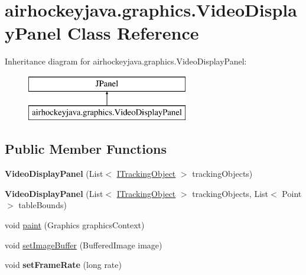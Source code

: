 \hypertarget{classairhockeyjava_1_1graphics_1_1_video_display_panel}{}\section{airhockeyjava.\+graphics.\+Video\+Display\+Panel Class Reference}
\label{classairhockeyjava_1_1graphics_1_1_video_display_panel}
Inheritance diagram for airhockeyjava.\+graphics.\+Video\+Display\+Panel\+:\begin{figure}[H]
\begin{center}
\leavevmode
\includegraphics[height=2.000000cm]{classairhockeyjava_1_1graphics_1_1_video_display_panel}
\end{center}
\end{figure}
\subsection*{Public Member Functions}
\begin{DoxyCompactItemize}
\item 
\hypertarget{classairhockeyjava_1_1graphics_1_1_video_display_panel_a5dc899a402834d27f1c40504cfdc2646}{}{\bfseries Video\+Display\+Panel} (List$<$ \hyperlink{interfaceairhockeyjava_1_1detection_1_1_i_tracking_object}{I\+Tracking\+Object} $>$ tracking\+Objects)\label{classairhockeyjava_1_1graphics_1_1_video_display_panel_a5dc899a402834d27f1c40504cfdc2646}

\item 
\hypertarget{classairhockeyjava_1_1graphics_1_1_video_display_panel_a5ddde84f00088c31dc4d0a8604b6f9e9}{}{\bfseries Video\+Display\+Panel} (List$<$ \hyperlink{interfaceairhockeyjava_1_1detection_1_1_i_tracking_object}{I\+Tracking\+Object} $>$ tracking\+Objects, List$<$ Point $>$ table\+Bounds)\label{classairhockeyjava_1_1graphics_1_1_video_display_panel_a5ddde84f00088c31dc4d0a8604b6f9e9}

\item 
void \hyperlink{classairhockeyjava_1_1graphics_1_1_video_display_panel_aab95d9d9ad11728a88c2a51a3de78052}{paint} (Graphics graphics\+Context)
\item 
void \hyperlink{classairhockeyjava_1_1graphics_1_1_video_display_panel_a8ce0da2a325f593b6162c7ba54b1029e}{set\+Image\+Buffer} (Buffered\+Image image)
\item 
\hypertarget{classairhockeyjava_1_1graphics_1_1_video_display_panel_a8c8caa1d5bc25d13406794eac1995721}{}void {\bfseries set\+Frame\+Rate} (long rate)\label{classairhockeyjava_1_1graphics_1_1_video_display_panel_a8c8caa1d5bc25d13406794eac1995721}

\end{DoxyCompactItemize}


